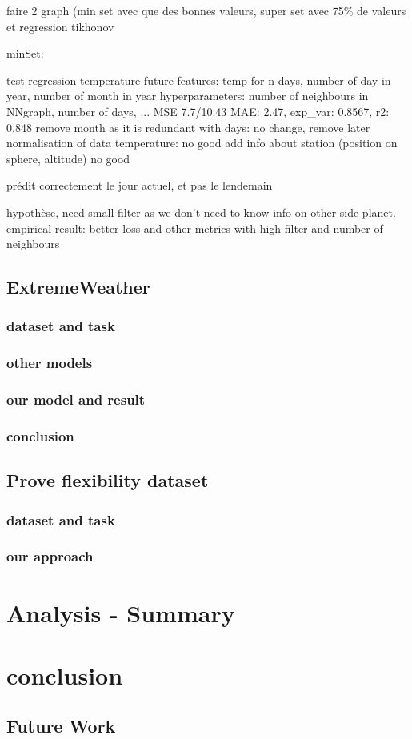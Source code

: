 \documentclass[11pt]{report}
\begin{document}
faire 2 graph (min set avec que des bonnes valeurs, super set avec 75\% de valeurs et regression tikhonov

minSet:

test regression temperature future
features: temp for n days, number of day in year, number of month in year
hyperparameters: number of neighbours in NNgraph, number of days, ...
MSE 7.7/10.43 MAE: 2.47, exp\_var: 0.8567, r2: 0.848
remove month as it is redundant with days:
no change, remove later
normalisation of data temperature:
no good
add info about station (position on sphere, altitude)
no good

prédit correctement le jour actuel, et pas le lendemain

hypothèse, need small filter as we don't need to know info on other side planet.
empirical result: better loss and other metrics with high filter and number of neighbours

\section{ExtremeWeather}
\subsection{dataset and task}
\subsection{other models}
\subsection{our model and result}
\subsection{conclusion}

\section{Prove flexibility dataset}
\subsection{dataset and task}
\subsection{our approach}


\chapter{Analysis - Summary}
\chapter{conclusion}
\section{Future Work}
\printbibliography
{}
\appendix
\end{document}
